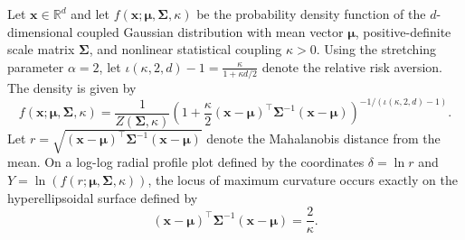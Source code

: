 \documentclass[twoside,11pt]{article}
\begin{document}
\begin{theorem}
\label{thm:bending_surface_d_dim}
Let $\mathbf{x} \in \mathbb{R}^d$ and let $f\left(\mathbf{x};\boldsymbol{\mu},\boldsymbol{\Sigma},\kappa\right)$ be the probability density function of the $d$-dimensional coupled Gaussian distribution with mean vector $\boldsymbol{\mu}$, positive-definite scale matrix $\boldsymbol{\Sigma}$, and nonlinear statistical coupling $\kappa > 0$. Using the stretching parameter $\alpha=2$, let $\iota(\kappa,2,d)-1=\frac{\kappa}{1 + \kappa d/2}$ denote the relative risk aversion. The density is given by
\begin{equation}
    f\left(\mathbf{x};\boldsymbol{\mu},\boldsymbol{\Sigma},\kappa\right) = \frac{1}{Z(\boldsymbol{\Sigma}, \kappa)} \left( 1 + \frac{\kappa}{2} (\mathbf{x} - \boldsymbol{\mu})^\intercal \boldsymbol{\Sigma}^{-1} (\mathbf{x} - \boldsymbol{\mu}) \right)^{-1/(\iota(\kappa,2,d)-1)}.
\end{equation}
Let $r = \sqrt{(\mathbf{x} - \boldsymbol{\mu})^\intercal \boldsymbol{\Sigma}^{-1} (\mathbf{x} - \boldsymbol{\mu})}$ denote the Mahalanobis distance from the mean. On a log-log radial profile plot defined by the coordinates $\delta = \ln r$ and $Y = \ln\left(f\left(r;\boldsymbol{\mu},\boldsymbol{\Sigma},\kappa\right)\right)$, the locus of maximum curvature occurs exactly on the hyperellipsoidal surface defined by
\begin{equation}
    (\mathbf{x} - \boldsymbol{\mu})^\intercal \boldsymbol{\Sigma}^{-1} (\mathbf{x} - \boldsymbol{\mu}) = \frac{2}{\kappa}.
\end{equation}
\end{theorem}
\end{document}
